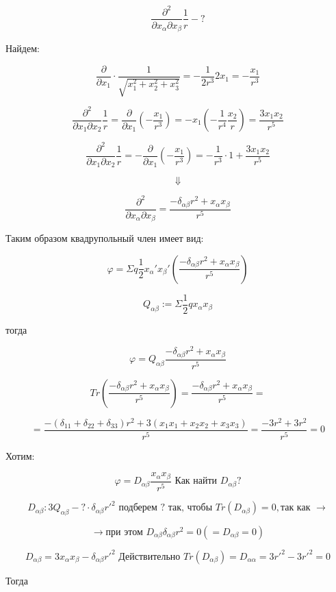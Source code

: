 \documentclass[a4paper,12pt]{article}
\newcommand{\fc}[1]{\[#1\]}
\begin{document}
\fc{\frac{\partial^2}{\partial x_{\alpha}\partial x_{\beta}}\frac{1}{r}-?}

Найдем:

\fc{\frac{\partial}{\partial x_1}\cdot \frac{1}{\sqrt{x_1^2+x_2^2+x_3^2}}=-\frac{1}{2r^3}2x_1=-\frac{x_1}{r^3}}

\newpage

\fc{\frac{\partial^2}{\partial x_1 \partial x_2}\frac{1}{r}=\frac{\partial}{\partial x_1}\left(-\frac{x_1}{r^3}\right)=-x_1 \left(-\frac{1}{r^4}\frac{x_2}{r} \right)=\frac{3 x_1 x_2}{r^5}}

\fc{\frac{\partial^2}{\partial x_1 \partial x_2}\frac{1}{r}=-\frac{\partial}{\partial x_1}\left(-\frac{x_1}{r^3}\right)=-\frac{1}{r^3}\cdot 1+\frac{3x_1x_2}{r^5}}

\fc{\Downarrow}

\fc{\frac{\partial^2}{\partial x_{\alpha}\partial x_{\beta}}=\frac{-\delta_{\alpha\beta}r^2+x_{\alpha}x_{\beta}}{r^5}}

Таким образом квадрупольный член имеет вид:

\fc{\varphi=\Sigma q\frac{1}{2}x_{\alpha}'x_{\beta}'\left( \frac{-\delta_{\alpha\beta}r^2+x_{\alpha}x_{\beta}}{r^5}\right)}

\fc{Q_{\alpha\beta}:=\Sigma \frac{1}{2}qx_{\alpha}x_{\beta}}

тогда 

\fc{\varphi=Q_{\alpha\beta}\frac{-\delta_{\alpha\beta}r^2+x_{\alpha}x_{\beta}}{r^5}}

\fc{Tr\left(\frac{-\delta_{\alpha\beta}r^2+x_{\alpha}x_{\beta}}{r^5}\right)=\frac{-\delta_{\alpha\beta}r^2+x_{\alpha}x_{\beta}}{r^5}=}

\fc{=\frac{-(\delta_{11}+\delta_{22}+\delta_{33})r^2+3(x_1x_1+x_2x_2+x_3x_3)}{r^5}=\frac{-3r^2+3r^2}{r^5}=0}

Хотим:

\fc{\varphi=D_{\alpha\beta}\frac{x_{\alpha}x_{\beta}}{r^5}\text{ Как найти } D_{\alpha\beta} ?}

\fc{D_{\alpha\beta}:3Q_{\alpha\beta}-?\cdot\delta_{\alpha\beta}r'^2 \text{ подберем ? так, чтобы } Tr(D_{\alpha\beta})=0, \text{так как }\rightarrow}

\fc{\rightarrow \text{при этом }D_{\alpha\beta}\delta_{\alpha\beta}r^2=0(=D_{\alpha\beta}=0)}

\fc{D_{\alpha\beta}=3x_{\alpha}x_{\beta}-\delta_{\alpha\beta}r'^2 \text{ Действительно } Tr(D_{\alpha\beta})=D_{\alpha\alpha}=3r'^2-3r'^2=0}

Тогда 
\end{document}
